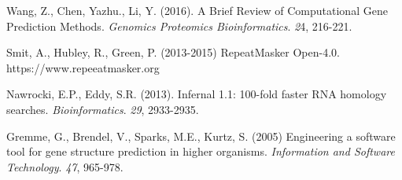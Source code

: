 \documentclass[12pt]{article}
\begin{document}
\begin{thebibliography}{99}
 Wang, Z., Chen, Yazhu., Li, Y. (2016). A Brief
  Review of Computational Gene Prediction Methods. \textit{Genomics
    Proteomics Bioinformatics}. \textit{2}4, 216-221.

 Smit, A., Hubley, R., Green, P. (2013-2015)
  RepeatMasker Open-4.0. https://www.repeeatmasker.org

 Nawrocki, E.P., Eddy, S.R. (2013). Infernal 1.1:
  100-fold faster RNA homology
  searches. \textit{Bioinformatics}. \textit{29}, 2933-2935.

 Gremme, G., Brendel, V., Sparks, M.E., Kurtz,
  S. (2005) Engineering a software tool for gene structure prediction
  in higher organisms. \textit{Information and Software
    Technology}. \textit{47}, 965-978.
  
\end{thebibliography}
\end{document}
